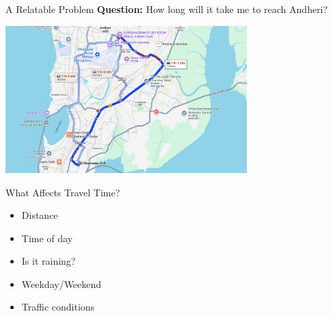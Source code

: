 \documentclass[10pt]{beamer}
\begin{document}
\begin{frame}{A Relatable Problem}
  \textbf{Question:} How long will it take me to reach Andheri?
  
  \vspace{1em}
  \begin{center}
    \includegraphics[width=0.7\textwidth,height=0.6\textheight,keepaspectratio]{images/mumbai_map.png}
  \end{center}
\end{frame}

\begin{frame}{What Affects Travel Time?}
  \begin{center}
    \vspace{2em}
    \Large
    \begin{itemize}
      \item Distance
      \item Time of day
      \item Is it raining?
      \item Weekday/Weekend
      \item Traffic conditions
    \end{itemize}
  \end{center}
\end{frame}
\end{document}
